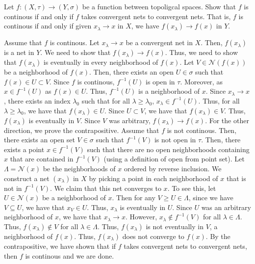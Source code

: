 \documentclass[12pt]{article}
\begin{document}
\begin{problem}{48}
    Let $f: (X, \tau) \to (Y, \sigma)$ be a function between topoligcal spaces. Show that $f$ is continous if and only if $f$ takes convergent nets to convergent nets. That is, $f$ is continous if and only if given $x_\lambda \to x$ in $X$, we have $f(x_\lambda) \to f(x)$ in $Y$. 
\end{problem}
\begin{solution}
    Assume that $f$ is continous. Let $x_\lambda \to x$ be a convergent net in $X$. Then, $f(x_\lambda)$ is a net in $Y$. We need to show that $f(x_\lambda) \to f(x)$. Thus, we need to show that $f(x_\lambda)$ is eventually in every neighborhood of $f(x)$. \bbni
    Let $V \in \mathcal N(f(x))$ be a neighborhood of $f(x)$. Then, there exists an open $U \in \sigma$ such that $f(x) \in U \subset V$. Since $f$ is continous, $f^{-1}(U)$ is open in $\tau$. Moreover, as $x \in f^{-1}(U)$ as $f(x) \in U$. Thus, $f^{-1}(U)$ is a neighborhood of $x$. Since $x_\lambda \to x$, there exists an index $\lambda_0$ such that for all $\lambda \geq \lambda_0$, $x_\lambda \in f^{-1}(U)$. Thus, for all $\lambda \geq \lambda_0$, we have that $f(x_\lambda) \in U$. Since $U \subset V$, we have that $f(x_\lambda) \in V$. Thus, $f(x_\lambda)$ is eventually in $V$. Since $V$ was arbitrary, $f(x_\lambda) \to f(x)$. \bbni
    For the other direction, we prove the contrapositive. Assume that $f$ is not continous. Then, there exists an open set $V \in \sigma$ such that $f^{-1}(V)$ is not open in $\tau$. Then, there exists a point $x \in f^{-1}(V)$ such that there are no open neighborhoods containing $x$ that are contained in $f^{-1}(V)$ (using a definition of open from point set). \bbni 
    Let $\Lambda = \mathcal N(x)$ be the neighborhoods of $x$ ordered by reverse inclusion. We construct a net $(x_\lambda)$ in $X$ by picking a point in each neighborhood of $x$ that is not in $f^{-1}(V)$. We claim that this net converges to $x$. To see this, let $U \in \mathcal N(x)$ be a neighborhood of $x$. Then for any $V \geq U \in \Lambda$, since we have $V \subseteq U$, we have that $x_V \in U$. Thus, $x_\lambda$ is eventually in $U$. Since $U$ was an arbitrary neighborhood of $x$, we have that $x_\lambda \to x$. \bbni  
    However, $x_\lambda \not \in  f^{-1}(V)$ for all $\lambda \in \Lambda$. Thus, $f(x_\lambda) \not \in V$ for all $\lambda \in \Lambda$. Thus, $f(x_\lambda)$ is not eventually in $V$, a neighborhood of $f(x)$. Thus, $f(x_\lambda)$ does not converge to $f(x)$. \bbni
    By the contrapositive, we have shown that if $f$ takes convergent nets to convergent nets, then $f$ is continous and we are done.
\end{solution}
\newpage
\end{document}
